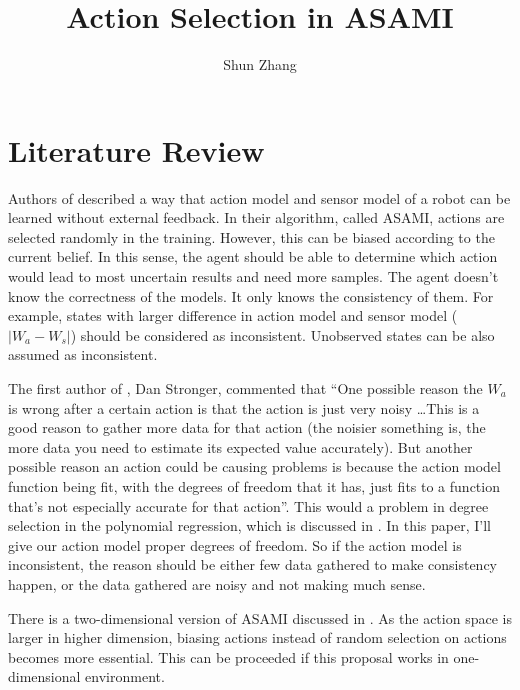 \documentclass[10pt]{article}
\title{Action Selection in ASAMI}
\author{Shun Zhang}
\date{}
\begin{document}
\maketitle


\sloppy
\section{Literature Review}

Authors of \cite{CSJ06} described a way that action model and sensor
model of a robot can be learned without external feedback.  In their
algorithm, called ASAMI, actions are selected randomly in the
training. However, this can be biased according to the current belief.
In this sense, the agent should be able to determine which action
would lead to most uncertain results and need more samples.  The agent
doesn't know the correctness of the models. It only knows the
consistency of them. For example, states with larger difference in
action model and sensor model ($|W_a - W_s|$) should be considered as
inconsistent. Unobserved states can be also assumed as inconsistent.

The first author of \cite{CSJ06}, Dan Stronger, commented that ``One
possible reason the $W_a$ is wrong after a certain action is that the
action is just very noisy \ldots This is a good reason to gather more
data for that action (the noisier something is, the more data you need
to estimate its expected value accurately).  But another possible
reason  an action could be causing problems is because the action
model function being fit, with the degrees of freedom that it has,
just fits to a function that's not especially accurate for that
action''. This would a problem in degree selection in the polynomial
regression, which is discussed in \cite{IJAIT08-stronger}. In this
paper, I'll give our action model proper degrees of freedom. So if the
action model is inconsistent, the reason should be either few data
gathered to make consistency happen, or the data gathered are noisy
and not making much sense.

There is a two-dimensional version of ASAMI discussed in
\cite{ICRA08-stronger}.  As the action space is larger in higher
dimension, biasing actions instead of random selection on actions
becomes more essential. This can be proceeded if this proposal works
in one-dimensional environment.
\end{document}
